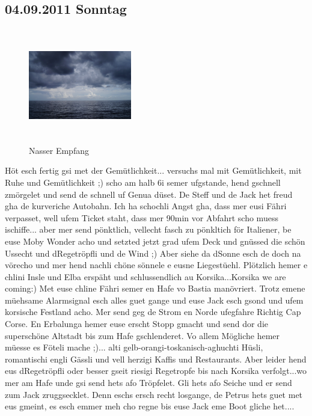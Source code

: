 \subsection{04.09.2011 Sonntag}
\begin{figure} 
  \begin{centering}
    \includegraphics[width=0.4\textwidth, height=5cm, keepaspectratio]{../Bilder/Korsika/3.jpg}
    \caption{Nasser Empfang}
  \end{centering}
\end{figure} 
Höt esch fertig gsi met der Gemütlichkeit...
versuchs mal mit Gemütlichkeit, mit Ruhe und Gemütlichkeit ;) scho am halb 6i semer ufgstande, hend gschnell zmörgelet und send de schnell uf Genua düset.
De Steff und de Jack het freud gha de kurveriche Autobahn.
Ich ha schochli Angst gha, dass mer eusi Fähri verpasset, well ufem Ticket staht, dass mer 90min vor Abfahrt scho muess ischiffe...
aber mer send pönktlich, vellecht fasch zu pönkltich för Italiener, be euse Moby Wonder acho und setzted jetzt grad ufem Deck und gnüssed die schön Ussecht und dRegetröpfli und de Wind ;) Aber siehe da dSonne esch de doch na vörecho und mer hend nachli chöne sönnele e eusne Liegestüehl.
Plötzlich hemer e chlini Insle und Elba erspäht und schlussendlich au Korsika...Korsika we are coming:) 
Met euse chline Fähri semer en Hafe vo Bastia manövriert.
Trotz emene müehsame Alarmsignal esch alles guet gange und euse Jack esch gsond und ufem korsische Festland acho.
Mer send geg de Strom en Norde ufegfahre Richtig Cap Corse.
En Erbalunga hemer euse erscht Stopp gmacht und send dor die superschöne Altstadt bis zum Hafe gschlenderet.
Vo allem Mögliche hemer müesse es Föteli mache ;)... alti gelb-orangi-toskanisch-aghuchti Hüsli, romantischi engli Gässli und vell herzigi Kaffis und Restaurants.
Aber leider hend eus dRegetröpfli oder besser gseit riesigi Regetropfe bis nach Korsika verfolgt...wo mer am Hafe unde gsi send hets afo Tröpfelet.
Gli hets afo Seiche und er send zum Jack zruggsecklet.
Denn eschs ersch recht losgange, de Petrus hets guet met eus gmeint, es esch emmer meh cho regne bis euse Jack eme Boot gliche het....
